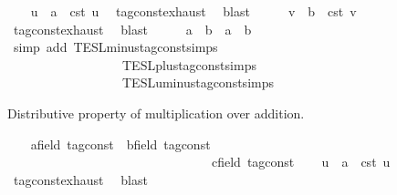 \begin{isabellebody}
\ \ \isamarkupfalse%
\ u\ \ {\isacartoucheopen}a\ {\isacharequal}\ {\isasymtau}\isactrlsub c\isactrlsub s\isactrlsub t\ u{\isacartoucheclose}\ \isamarkupfalse%
\ tag{\isacharunderscore}const{\isachardot}exhaust\ \isamarkupfalse%
\ blast\isanewline
\ \ \isamarkupfalse%
\ \isamarkupfalse%
\ v\ \ {\isacartoucheopen}b\ {\isacharequal}\ {\isasymtau}\isactrlsub c\isactrlsub s\isactrlsub t\ v{\isacartoucheclose}\ \isamarkupfalse%
\ tag{\isacharunderscore}const{\isachardot}exhaust\ \isamarkupfalse%
\ blast\isanewline
\ \ \isamarkupfalse%
\ \isamarkupfalse%
\ {\isacartoucheopen}a\ {\isacharminus}\ b\ {\isacharequal}\ a\ {\isacharplus}\ {\isacharminus}b{\isacartoucheclose}\isanewline
\ \ \ \ \isamarkupfalse%
\ {\isacharparenleft}simp\ add{\isacharcolon}\ TESL{\isachardot}minus{\isacharunderscore}tag{\isacharunderscore}const{\isachardot}simps\isanewline
\ \ \ \ \ \ \ \ \ \ \ \ \ \ \ \ \ \ TESL{\isachardot}plus{\isacharunderscore}tag{\isacharunderscore}const{\isachardot}simps\isanewline
\ \ \ \ \ \ \ \ \ \ \ \ \ \ \ \ \ \ TESL{\isachardot}uminus{\isacharunderscore}tag{\isacharunderscore}const{\isachardot}simps{\isacharparenright}\isanewline
{}\isamarkupfalse%
%
\begin{isamarkuptext}%
Distributive property of multiplication over addition.%
\end{isamarkuptext}\isamarkuptrue%
\ \ \isamarkupfalse%
\ a{\isacharcolon}{\isacharcolon}{\isacartoucheopen}{\isacharprime}{\isasymtau}{\isacharcolon}{\isacharcolon}field\ tag{\isacharunderscore}const{\isacartoucheclose}\ \ b{\isacharcolon}{\isacharcolon}{\isacartoucheopen}{\isacharprime}{\isasymtau}{\isacharcolon}{\isacharcolon}field\ tag{\isacharunderscore}const{\isacartoucheclose}\isanewline
\ \ \ \ \ \ \ \ \ \ \ \ \ \ \ \ \ \ \ \ \ \ \ \ \ \ \ \ \ \ \ \ c{\isacharcolon}{\isacharcolon}{\isacartoucheopen}{\isacharprime}{\isasymtau}{\isacharcolon}{\isacharcolon}field\ tag{\isacharunderscore}const{\isacartoucheclose}\isanewline
\ \ \isamarkupfalse%
\ u\ \ {\isacartoucheopen}a\ {\isacharequal}\ {\isasymtau}\isactrlsub c\isactrlsub s\isactrlsub t\ u{\isacartoucheclose}\ \isamarkupfalse%
\ tag{\isacharunderscore}const{\isachardot}exhaust\ \isamarkupfalse%
\ blast\isanewline
\ \ \isamarkupfalse%

\end{isabellebody}
